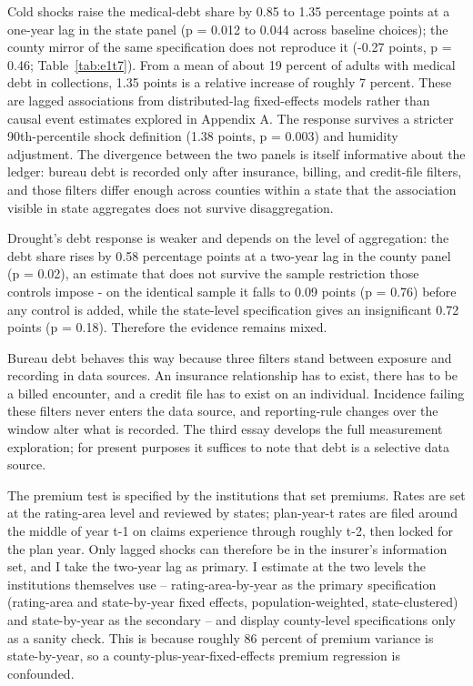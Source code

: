 \documentclass[a4paper,11pt]{report}
\begin{document}
Cold shocks raise the medical-debt share by 0.85 to 1.35 percentage points at a one-year lag in the state panel (p = 0.012 to 0.044 across baseline choices); the county mirror of the same specification does not reproduce it (-0.27 points, p = 0.46; Table~\ref{tab:e1t7}). From a mean of about 19 percent of adults with medical debt in collections, 1.35 points is a relative increase of roughly 7 percent. These are lagged associations from distributed-lag fixed-effects models rather than causal event estimates explored in Appendix A. The response survives a stricter 90th-percentile shock definition (1.38 points, p = 0.003) and humidity adjustment. The divergence between the two panels is itself informative about the ledger: bureau debt is recorded only after insurance, billing, and credit-file filters, and those filters differ enough across counties within a state that the association visible in state aggregates does not survive disaggregation.

Drought's debt response is weaker and depends on the level of aggregation: the debt share rises by 0.58 percentage points at a two-year lag in the county panel (p = 0.02), an estimate that does not survive the sample restriction those controls impose - on the identical sample it falls to 0.09 points (p = 0.76) before any control is added, while the state-level specification gives an insignificant 0.72 points (p = 0.18). Therefore the evidence remains mixed.

Bureau debt behaves this way because three filters stand between exposure and recording in data sources.  An insurance relationship has to exist, there has to be a billed encounter, and a credit file has to exist on an individual. Incidence failing these filters never enters the data source, and reporting-rule changes over the window alter what is recorded. The third essay develops the full measurement exploration; for present purposes it suffices to note that debt is a selective data source.

The premium test is specified by the institutions that set premiums. Rates are set at the rating-area level and reviewed by states; plan-year-t rates are filed around the middle of year t-1 on claims experience through roughly t-2, then locked for the plan year. Only lagged shocks can therefore be in the insurer's information set, and I take the two-year lag as primary. I estimate at the two levels the institutions themselves use -- rating-area-by-year as the primary specification (rating-area and state-by-year fixed effects, population-weighted, state-clustered) and state-by-year as the secondary -- and display county-level specifications only as a sanity check. This is because roughly 86 percent of premium variance is state-by-year, so a county-plus-year-fixed-effects premium regression is confounded.
\end{document}
